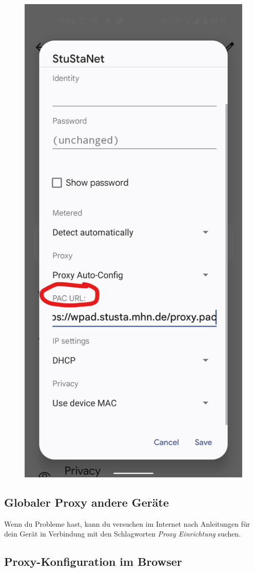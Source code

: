 \documentclass[a4paper,12pt]{scrartcl}
\begin{document}
\begin{figure}[h]
\begin{minipage}{0.20\textwidth}
		\includegraphics[width=0.7\linewidth,keepaspectratio]{Bilder/Android/android12_4}
	\end{minipage}
\end{figure}

\subsection*{Globaler Proxy andere Geräte}
Wenn du Probleme hast, kann du versuchen im Internet nach Anleitungen für dein Gerät in Verbindung mit den Schlagworten \textit{Proxy Einrichtung} suchen.

\subsection*{Proxy-Konfiguration im Browser}
\label{Proxy}
\end{document}

